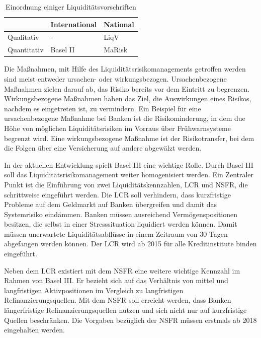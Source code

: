 {
\setlength{\extrarowheight}{2pt}
\begin{table}[htbp]
\centering
\begin{tabular}{| l | >{\centering\arraybackslash} m{4cm} | >{\centering\arraybackslash} m{4cm} |}
\cline{2-3}
\multicolumn{1}{l|}{}	& International & National 		\\	\hline
Qualitativ 				& - 			& \gls{LiqV}	\\	\hline
Quantitativ 			& Basel II 		& \gls{MaRisk}	\\	\hline
\end{tabular} 
\caption{Einordnung einiger Liquiditätsvorschriften \label{table:einordnung}}
\end{table}
}

Die Maßnahmen, mit Hilfe des Liquiditätsrisikomanagements getroffen werden sind meist entweder ursachen- oder wirkungsbezogen. Ursachenbezogene Maßnahmen zielen darauf ab, das Risiko bereits vor dem Eintritt zu begrenzen. Wirkungsbezogene Maßnahmen haben das Ziel, die Auswirkungen eines Risikos, nachdem es eingetreten ist, zu vermindern. Ein Beispiel für eine ursachenbezogene Maßnahme bei Banken ist die Risikominderung, in dem due Höhe von möglichen Liquiditätsrisiken im Vorraus über Frühwarnsysteme begrenzt wird. Eine wirkungsbezogene Maßnahme ist der Risikotransfer, bei dem die Folgen über eine Versicherung auf andere abgewälzt werden.

In der aktuellen Entwicklung spielt Basel III eine wichtige Rolle. Durch Basel III soll das Liquiditätsrisikomanagement weiter homogenisiert werden. Ein Zentraler Punkt ist die Einführung von zwei Liquiditätskennzahlen, \gls{LCR} und \gls{NSFR}, die schrittweise eingeführt werden. Die \gls{LCR} soll verhindern, dass kurzfristige Probleme auf dem Geldmarkt auf Banken übergreifen und damit das Systemrisiko eindämmen. Banken müssen ausreichend Vermögenspositionen besitzen, die selbst in einer Stresssituation liquidiert werden können. Damit müssen unerwartete Liquiditätsabflüsse in einem Zeitraum von 30 Tagen abgefangen werden können. Der \gls{LCR} wird ab 2015 für alle Kreditinstitute binden eingeführt.

Neben dem \gls{LCR} existiert mit dem \gls{NSFR} eine weitere wichtige Kennzahl im Rahmen von Basel III. Er bezieht sich auf das Verhältnis von mittel und langfristigen Aktivpositionen im Vergleich zu langfristigen Refinanzierungsquellen. Mit dem \gls{NSFR} soll erreicht werden, dass Banken längerfristige Refinanzierungsquellen nutzen und sich nicht nur auf kurzfristige Quellen beschränken. Die Vorgaben bezüglich der \gls{NSFR} müssen erstmals ab 2018 eingehalten werden.

